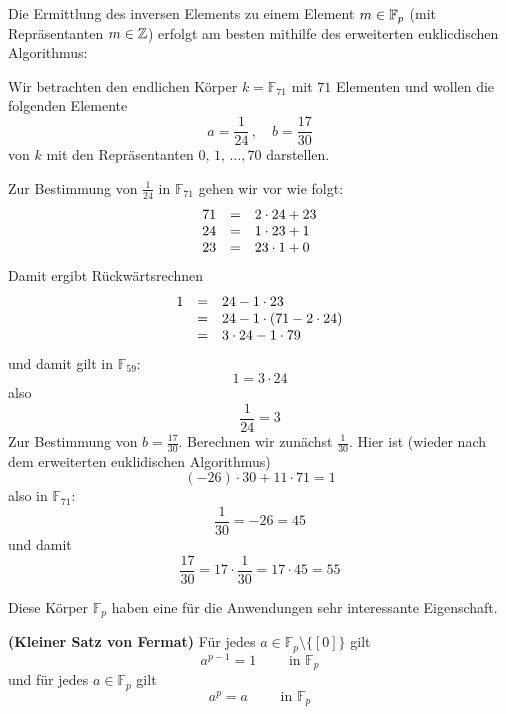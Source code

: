 \begin{beispiel}
Die Ermittlung des inversen Elements zu einem Element $m \in \mathbb F_p$ (mit Repräsentanten $m \in \mathbb Z$) erfolgt 
am besten mithilfe des erweiterten euklicdischen Algorithmus: 

Wir betrachten den endlichen Körper $k = \mathbb F_{71}$ mit $71$  
Elementen und wollen die folgenden Elemente
	$$ a = \frac {1}{24} \, , \quad b = \frac {17}{30} $$
von $k$ mit den Repräsentanten $0, \, 1, \, \ldots , 70$ darstellen.

Zur Bestimmung von $\frac {1}{24}$ in $\mathbb F_{71}$ gehen wir vor wie folgt:
 	$$ \begin{array} {l c l}
	71 &=& 2 \cdot 24 + 23 \\
	24 &=& 1 \cdot 23 + 1 \\
	23 &=& 23 \cdot 1 + 0 \\
	\end{array} $$
Damit ergibt Rückwärtsrechnen
	$$ \begin{array} {l c l}
	1 &=& 24 - 1 \cdot 23 \\
	&=& 24 - 1 \cdot (71 - 2 \cdot 24) \\
	&=& 3 \cdot 24 - 1 \cdot 79 \\
	\end{array} $$
und damit gilt in $\mathbb F_{59}$: 
	$$ 1 = 3 \cdot 24  $$
also 
	$$ \frac {1}{24} = 3 $$
Zur Bestimmung von $b = \frac {17}{30}$. Berechnen wir zunächst $\frac {1}{30}$.  Hier ist 
(wieder nach dem erweiterten euklidischen Algorithmus)
	$$ (-26) \cdot 30 + 11 \cdot 71 = 1 $$
also in $\mathbb F_{71}$:
	$$ \frac {1}{30} = -26 = 45 $$
 und damit 
	$$ \frac {17}{30} = 17 \cdot \frac {1}{30} = 17 \cdot 45 = 55 $$
\end{beispiel}

Diese Körper $\mathbb F_p$ haben eine für die Anwendungen sehr interessante Eigenschaft.

\begin{satz} \textbf{(Kleiner Satz von Fermat)} Für jedes $a \in 
\mathbb F_p \setminus \{ [0] \}$ gilt
  	$$ a^{p-1} = 1 \qquad \textrm{ in } \mathbb F_p $$
und für jedes $a \in \mathbb F_p$ gilt
  	$$ a^{p} = a \qquad \textrm{ in } \mathbb F_p $$
\end{satz}

\medbreak

